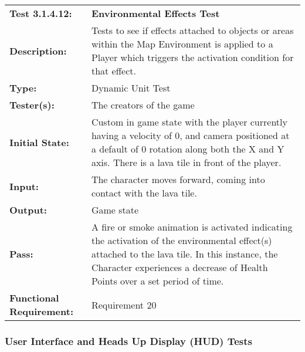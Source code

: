 \documentclass[12pt, titlepage]{article}
\begin{document}
\begin{mdframed}[linewidth=1pt]
\begin{tabularx}{\textwidth}{@{}p{3cm}X@{}}
{\bf Test 3.1.4.12:} & {\bf Environmental Effects Test}\\[\baselineskip]
{\bf Description:} & Tests to see if effects attached to objects or areas within the Map Environment is applied to a Player which triggers the activation condition for that effect. \\[0.5\baselineskip]
{\bf Type:} & Dynamic Unit Test\\[0.5\baselineskip]
{\bf Tester(s):} & The creators of the game\\[0.5\baselineskip]
{\bf Initial State:} & Custom in game state with the player currently having a velocity of 0, and camera positioned at a default of 0 rotation along both the X and Y axis. There is a lava tile in front of the player. \\[0.5\baselineskip]
{\bf Input:} & The character moves forward, coming into contact with the lava tile. \\[0.5\baselineskip]
{\bf Output:} & Game state\\[0.5\baselineskip]
{\bf Pass:} & A fire or smoke animation is activated indicating the activation of the environmental effect(s) attached to the lava tile. In this instance, the Character experiences a decrease of Health Points over a set period of time. \\[0.5\baselineskip]
{\bf Functional Requirement:} & Requirement 20
\end{tabularx}
\end{mdframed}

\newpage
\subsubsection{User Interface and Heads Up Display (HUD) Tests}
\end{document}
